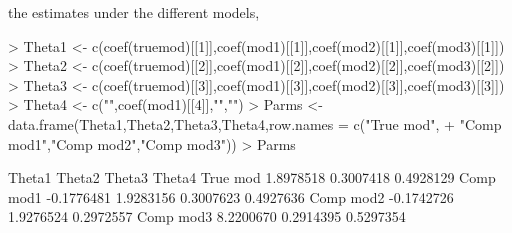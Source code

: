 the estimates under the different models,
\begin{Schunk}
\begin{Sinput}
> Theta1 <- c(coef(truemod)[[1]],coef(mod1)[[1]],coef(mod2)[[1]],coef(mod3)[[1]])
> Theta2 <- c(coef(truemod)[[2]],coef(mod1)[[2]],coef(mod2)[[2]],coef(mod3)[[2]])
> Theta3 <- c(coef(truemod)[[3]],coef(mod1)[[3]],coef(mod2)[[3]],coef(mod3)[[3]])
> Theta4 <- c("",coef(mod1)[[4]],"","")
> Parms  <- data.frame(Theta1,Theta2,Theta3,Theta4,row.names = c("True mod",
+                      "Comp mod1","Comp mod2","Comp mod3"))
> Parms
\end{Sinput}
\begin{Soutput}
              Theta1    Theta2    Theta3    Theta4
True mod   1.8978518 0.3007418 0.4928129        
Comp mod1 -0.1776481 1.9283156 0.3007623 0.4927636
Comp mod2 -0.1742726 1.9276524 0.2972557 
Comp mod3  8.2200670 0.2914395 0.5297354 
\end{Soutput}
\end{Schunk}

